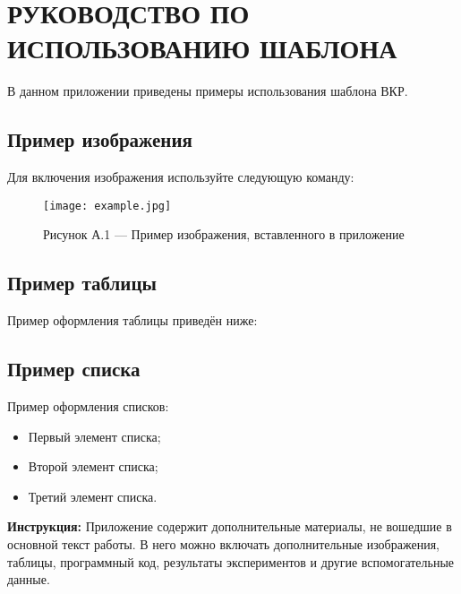 \chapter{РУКОВОДСТВО ПО ИСПОЛЬЗОВАНИЮ ШАБЛОНА}

В данном приложении приведены примеры использования шаблона ВКР.

\section*{Пример изображения}
Для включения изображения используйте следующую команду:
\begin{figure}[h!]
\centering
\texttt{[image: example.jpg]}
\caption{Рисунок А.1 --- Пример изображения, вставленного в приложение}
\end{figure}

\section*{Пример таблицы}
Пример оформления таблицы приведён ниже:
\ExampleMultiLevelTable
\ExampleSplitTable

\section*{Пример списка}
Пример оформления списков:
\begin{itemize}
  \item Первый элемент списка;
  \item Второй элемент списка;
  \item Третий элемент списка.
\end{itemize}

\bigskip
\textbf{Инструкция:} Приложение содержит дополнительные материалы, не вошедшие в основной текст работы. В него можно включать дополнительные изображения, таблицы, программный код, результаты экспериментов и другие вспомогательные данные.
